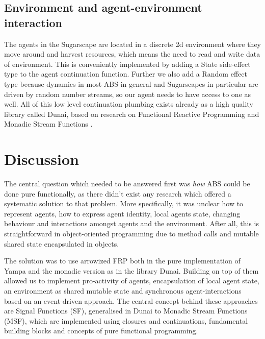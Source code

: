 \subsection{Environment and agent-environment interaction}
The agents in the Sugarscape are located in a discrete 2d environment where they move around and harvest resources, which means the need to read and write data of environment. This is conveniently implemented by adding a State side-effect type to the agent continuation function. Further we also add a Random effect type because dynamics in most ABS in general and Sugarscapes in particular are driven by random number streams, so our agent needs to have access to one as well. All of this low level continuation plumbing exists already as a high quality library called Dunai, based on research on Functional Reactive Programming  \cite{hudak_arrows_2003} and Monadic Stream Functions \cite{perez_functional_2016,perez_extensible_2017}.

\section{Discussion}
The central question which needed to be answered first was \textit{how} ABS could be done pure functionally, as there didn't exist any research which offered a systematic solution to that problem. More specifically, it was unclear how to represent agents, how to express agent identity, local agents state, changing behaviour and interactions amongst agents and the environment. After all, this is straightforward in object-oriented programming due to method calls and mutable shared state encapsulated in objects.

The solution was to use arrowized FRP both in the pure implementation of Yampa and the monadic version as in the library Dunai. Building on top of them allowed us to implement pro-activity of agents, encapsulation of local agent state, an environment as shared mutable state and synchronous agent-interactions based on an event-driven approach. The central concept behind these approaches are Signal Functions (SF), generalised in Dunai to Monadic Stream Functions (MSF), which are implemented using closures and continuations, fundamental building blocks and concepts of pure functional programming. 


